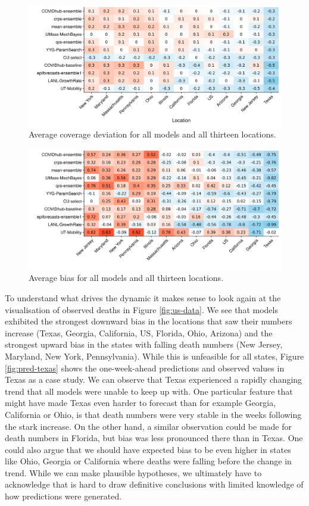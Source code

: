 \documentclass[
]{book}
\begin{document}
\begin{figure}
\includegraphics[width=1\linewidth]{../visualisation/chapter-5-results/heatmap-model-coverage} \caption{Average coverage deviation for all models and all thirteen locations.}\label{fig:coverage-deviation-states}
\end{figure}

\begin{figure}
\includegraphics[width=1\linewidth]{../visualisation/chapter-5-results/scenario-baseline/heatmap-model-bias} \caption{Average bias for all models and all thirteen locations.}\label{fig:bias-states}
\end{figure}

To understand what drives the dynamic it makes sense to look again at the visualisation of observed deaths in Figure \ref{fig:us-data}. We see that models exhibited the strongest downward bias in the locations that saw their numbers increase (Texas, Georgia, California, US, Florida, Ohio, Arizona) and the strongest upward bias in the states with falling death numbers (New Jersey, Maryland, New York, Pennsylvania). While this is unfeasible for all states, Figure \ref{fig:pred-texas} shows the one-week-ahead predictions and observed values in Texas as a case study. We can observe that Texas experienced a rapidly changing trend that all models were unable to keep up with. One particular feature that might have made Texas even harder to forecast than for example Georgia, California or Ohio, is that death numbers were very stable in the weeks following the stark increase. On the other hand, a similar observation could be made for death numbers in Florida, but bias was less pronounced there than in Texas. One could also argue that we should have expected bias to be even higher in states like Ohio, Georgia or California where deaths were falling before the change in trend. While we can make plausible hypotheses, we ultimately have to acknowledge that is hard to draw definitive conclusions with limited knowledge of how predictions were generated.
\end{document}
